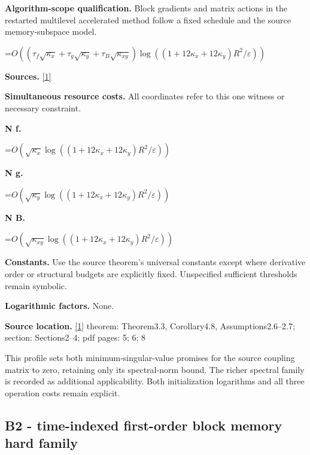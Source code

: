 \documentclass[10pt,a4paper]{article}
\newcommand{\AtlasMath}[1]{\par\begingroup\centering\setbox0=\hbox{$\displaystyle #1$}\ifdim\wd0>1.4\linewidth\typeout{ATLAS WIDE FORMULA: \the\wd0}\fi\ifdim\wd0>\linewidth\resizebox{\linewidth}{!}{\box0}\else\box0\fi\par\endgroup}
\begin{document}
\textbf{Algorithm-scope qualification.} Block gradients and matrix actions in the restarted multilevel accelerated method follow a fixed schedule and the source memory-subspace model.



\AtlasMath{O((\tau_f\sqrt{\kappa_x}+\tau_g\sqrt{\kappa_y}+\tau_B\sqrt{\kappa_{xy}})\log((1+12\kappa_x+12\kappa_y)R^2/\varepsilon))}


\textbf{Sources.} \href{https://raw.githubusercontent.com/mlresearch/v267/main/assets/borodich25a/borodich25a.pdf}{[1]}



\textbf{Simultaneous resource costs.} All coordinates refer to this one witness or necessary constraint.



\textbf{N f.}



\AtlasMath{O(\sqrt{\kappa_x}\log((1+12\kappa_x+12\kappa_y)R^2/\varepsilon))}


\textbf{N g.}



\AtlasMath{O(\sqrt{\kappa_y}\log((1+12\kappa_x+12\kappa_y)R^2/\varepsilon))}


\textbf{N B.}



\AtlasMath{O(\sqrt{\kappa_{xy}}\log((1+12\kappa_x+12\kappa_y)R^2/\varepsilon))}


\textbf{Constants.} Use the source theorem’s universal constants except where derivative order or structural budgets are explicitly fixed. Unspecified sufficient thresholds remain symbolic.



\textbf{Logarithmic factors.} None.



\textbf{Source location.} \href{https://raw.githubusercontent.com/mlresearch/v267/main/assets/borodich25a/borodich25a.pdf}{[1]} theorem: Theorem3.3, Corollary4.8, Assumptions2.6--2.7; section: Sections2--4; pdf pages: 5; 6; 8



This profile sets both minimum-singular-value promises for the source coupling matrix to zero, retaining only its spectral-norm bound. The richer spectral family is recorded as additional applicability. Both initialization logarithms and all three operation costs remain explicit.



\subsection{B2 - time-indexed first-order block memory hard family}
\end{document}
